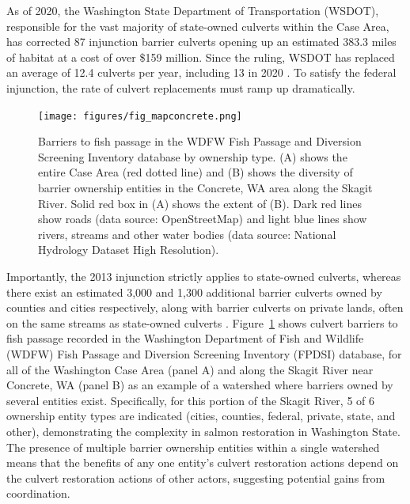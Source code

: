 As of 2020, the Washington State Department of Transportation (WSDOT), responsible for the vast majority of state-owned culverts within the Case Area, has corrected 87 injunction barrier culverts opening up an estimated 383.3 miles of habitat at a cost of over \$159 million. Since the ruling, WSDOT has replaced an average of 12.4 culverts per year, including 13 in 2020 \citep{noauthor_wsdot_2020}. To satisfy the federal injunction, the rate of culvert replacements must ramp up dramatically. 


\begin{figure}
\texttt{[image: figures/fig\_mapconcrete.png]}
\caption{Barriers to fish passage in the WDFW Fish Passage and Diversion Screening Inventory database by ownership type. (A) shows the entire Case Area (red dotted line) and (B) shows the diversity of barrier ownership entities in the Concrete, WA area along the Skagit River. Solid red box in (A) shows the extent of (B). Dark red lines show roads (data source: OpenStreetMap) and light blue lines show rivers, streams and other water bodies (data source: National Hydrology Dataset High Resolution).\label{fig:barrierMap}}
\end{figure}%

Importantly, the 2013 injunction strictly applies to state-owned culverts, whereas there exist an estimated 3,000 and 1,300 additional barrier culverts owned by counties and cities respectively, along with barrier culverts on private lands, often on the same streams as state-owned culverts \citep{brown_coming_2019}. Figure~\ref{fig:barrierMap} shows culvert barriers to fish passage recorded in the Washington Department of Fish and Wildlife (WDFW) Fish Passage and Diversion Screening Inventory (FPDSI) database, for all of the Washington Case Area (panel A) and along the Skagit River near Concrete, WA (panel B) as an example of a watershed where barriers owned by several entities exist. Specifically, for this portion of the Skagit River, 5 of 6 ownership entity types are indicated (cities, counties, federal, private, state, and other), demonstrating the complexity in salmon restoration in Washington State. The presence of multiple barrier ownership entities within a single watershed means that the benefits of any one entity's culvert restoration actions depend on the culvert restoration actions of other actors, suggesting potential gains from coordination. 

